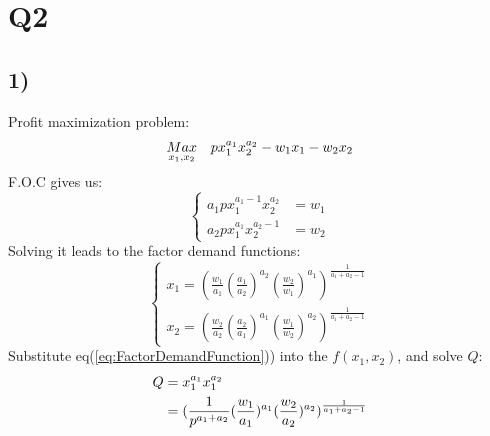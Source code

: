 \documentclass{article}
\begin{document}
\section*{Q2}
\subsection*{1)}
Profit maximization problem:
\begin{align}
	\notag \underset{x_1,x_2}{Max}\quad px_1^{a_1}x_2^{a_2}-w_1 x_1 - w_2 x_2
\end{align}
F.O.C gives us:
\begin{equation}
	\begin{cases}
	a_1 p x_1^{a_1-1} x_2^{a_2} &= w_1 \\ 
	a_2 p x_1^{a_1} x_2^{a_2-1} &= w_2
\end{cases}
\end{equation}
Solving it leads to the factor demand functions:
\begin{equation} \label{eq:FactorDemandFunction}
	\begin{cases}
		x_1 = (\frac{w_1}{a_1} (\frac{a_1}{a_2})^{a_2} (\frac{w_2}{w_1})^{a_1})^{\frac{1}{a_1 + a_2 -1}} \\
		x_2 = (\frac{w_2}{a_2} (\frac{a_2}{a_1})^{a_1} (\frac{w_1}{w_2})^{a_2})^{\frac{1}{a_1 + a_2 -1}}
	\end{cases}
\end{equation}
Substitute eq(\ref{eq:FactorDemandFunction})) into the $f(x_1,x_2)$, and solve $Q$:
\begin{align} \notag \label{eq:Supply1}
Q &= x^{a_1}_1 x^{a_2}_1\\
  &= (\frac{1}{p^{a_1+a_2}} (\frac{w_1}{a_1})^{a_1} (\frac{w_2}{a_2})^{a_2} )^{\frac{1}{a_1 + a_2 - 1}}
\end{align}
\end{document}
